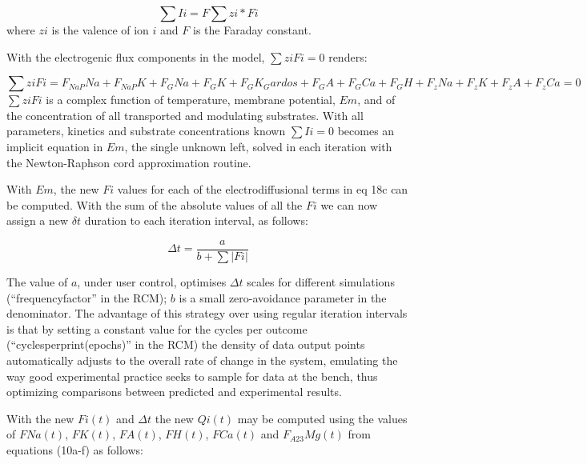 \documentclass[a4paper]{article}
\newcommand{\F}[2]{F_{#1}#2}
\begin{document}
\begin{equation}
\sum Ii = F\sum zi*Fi 
\end{equation}
where $zi$ is the valence of ion $i$ and $F$ is the Faraday constant. 

With the electrogenic flux components in the model, $\sum ziFi = 0$ renders:

\begin{equation}
\sum ziFi = \F{NaP}{Na} + \F{NaP}{K} + \F{G}{Na} + \F{G}{K} + \F{G}{K_Gardos} + \F{G}{A} + \F{G}{Ca} + \F{G}{H} + \F{z}{Na} + \F{z}{K} + \F{z}{A} + \F{z}{Ca} = 0
\end{equation}
$\sum ziFi$ is a complex function of temperature, membrane potential, $Em$, and of the concentration of all transported and modulating substrates.  With all parameters, kinetics and substrate concentrations known $\sum Ii = 0$ becomes an implicit equation in $Em$, the single unknown left, solved in each iteration with the Newton-Raphson cord approximation routine.      

With $Em$, the new $Fi$ values for each of the electrodiffusional terms in eq 18c can be computed.  With the sum of the absolute values of all the $Fi$ we can now assign a new $\delta t$ duration to each iteration interval, as follows:  

\setcounter{equation}{18}
\renewcommand{\theequation}{\arabic{equation}}
\begin{equation}
\Delta t = \frac{a}{b + \sum|Fi|}
\end{equation}

The value of $a$, under user control, optimises $\Delta t$ scales for different simulations (“frequencyfactor” in the RCM); $b$ is a small zero-avoidance parameter in the denominator. The advantage of this strategy over using regular iteration intervals is that by setting a constant value for the cycles per outcome (“cyclesperprint(epochs)” in the RCM) the density of data output points automatically adjusts to the overall rate of change in the system, emulating the way good experimental practice seeks to sample for data at the bench, thus optimizing comparisons between predicted and experimental results.    

With the new $Fi(t)$ and $\Delta t$ the new $Qi(t)$ may be computed using the values of $FNa(t)$, $FK(t)$, $FA(t)$, $FH(t)$, $FCa(t)$ and $\F{A23}{Mg}(t)$ from equations (10a-f) as follows:

\setcounter{equation}{0}
\renewcommand{\theequation}{20\alph{equation}}
\end{document}
